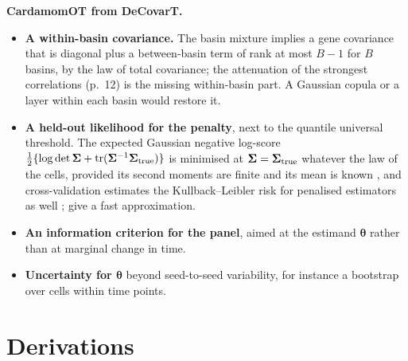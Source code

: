 \documentclass[11pt,a4paper]{article}
\begin{document}
\textbf{CardamomOT from DeCovarT.}
\begin{itemize}
  \item \textbf{A within-basin covariance.} The basin mixture implies a gene covariance that is diagonal
        plus a between-basin term of rank at most $B-1$ for $B$ basins, by the law of total covariance;
        the attenuation of the strongest correlations (p.~12) is the missing within-basin part. A Gaussian
        copula or a  layer within each basin would restore it.
  \item \textbf{A held-out likelihood for the penalty}, next to the quantile universal threshold. The
        expected Gaussian negative log-score $\tfrac12\{\log\det\bm{\Sigma}+\operatorname{tr}(\bm{\Sigma}^{-1}\bm{\Sigma}_{\mathrm{true}})\}$
        is minimised at $\bm{\Sigma}=\bm{\Sigma}_{\mathrm{true}}$ whatever the law of the cells, provided its
        second moments are finite and its mean is known , and
        cross-validation estimates the Kullback--Leibler risk for penalised estimators as well
        \parencite{commengesDynamicalBiostatisticalModels2015}; \parencite{commengesUniversalApproximateCrossvalidation2012} give a fast approximation.
  \item \textbf{An information criterion for the panel}, aimed at the estimand $\bm\theta$ rather than at
        marginal change in time.
  \item \textbf{Uncertainty for $\bm\theta$} beyond seed-to-seed variability, for instance a bootstrap
        over cells within time points.
\end{itemize}

\printbibliography[heading=bibintoc]

\clearpage
\appendix
\section{Derivations}\label{app:derivations}
\enlargethispage{\baselineskip}%
\end{document}
